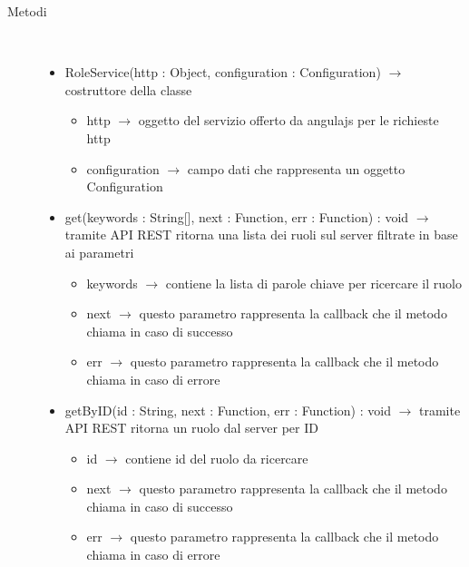 \begin{description}
\item[Metodi] \hfill \\
\vspace{-7mm}
\begin{itemize}
	\item RoleService(http : Object, configuration : Configuration) $\rightarrow$ costruttore della classe\begin{itemize}
		\item http $\rightarrow$ oggetto del servizio offerto da angulajs per le richieste http
		\item configuration $\rightarrow$ campo dati che rappresenta un oggetto Configuration
	\end{itemize}
	
	\item get(keywords : String[], next : Function, err : Function) : void $\rightarrow$ tramite API REST ritorna una lista dei ruoli sul server filtrate in base ai parametri\begin{itemize}
		\item keywords $\rightarrow$ contiene la lista di parole chiave per ricercare il ruolo
		\item next $\rightarrow$ questo parametro rappresenta la callback che il metodo chiama in caso di successo
		\item err $\rightarrow$ questo parametro rappresenta la callback che il metodo chiama in caso di errore
	\end{itemize}
	
	\item getByID(id : String, next : Function, err : Function) : void $\rightarrow$ tramite API REST ritorna un ruolo dal server per ID\begin{itemize}
		\item id $\rightarrow$ contiene id del ruolo da ricercare
		\item next $\rightarrow$ questo parametro rappresenta la callback che il metodo chiama in caso di successo
		\item err $\rightarrow$ questo parametro rappresenta la callback che il metodo chiama in caso di errore
	\end{itemize}
	
\end{itemize}

\end{description}

